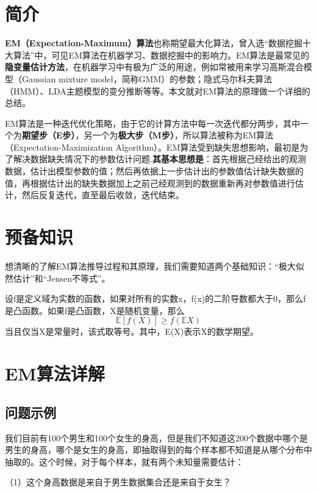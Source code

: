 \documentclass[11pt,a4paper,oneside]{book}
\begin{document}
\section{简介}
\textbf{EM（Expectation-Maximum）算法}也称期望最大化算法，曾入选“数据挖掘十大算法”中，可见EM算法在机器学习、数据挖掘中的影响力。EM算法是最常见的\textbf{隐变量估计方法}，在机器学习中有极为广泛的用途，例如常被用来学习高斯混合模型（Gaussian mixture model，简称GMM）的参数；隐式马尔科夫算法（HMM）、LDA主题模型的变分推断等等。本文就对EM算法的原理做一个详细的总结。

EM算法是一种迭代优化策略，由于它的计算方法中每一次迭代都分两步，其中一个为\textbf{期望步（E步）}，另一个为\textbf{极大步（M步）}，所以算法被称为EM算法（Expectation-Maximization Algorithm）。EM算法受到缺失思想影响，最初是为了解决数据缺失情况下的参数估计问题.\textbf{其基本思想是}：首先根据己经给出的观测数据，估计出模型参数的值；然后再依据上一步估计出的参数值估计缺失数据的值，再根据估计出的缺失数据加上之前己经观测到的数据重新再对参数值进行估计，然后反复迭代，直至最后收敛，迭代结束。
\section{预备知识}
想清晰的了解EM算法推导过程和其原理，我们需要知道两个基础知识：“极大似然估计”和“Jensen不等式”。

设f是定义域为实数的函数，如果对所有的实数x，f(x)的二阶导数都大于0，那么f是凸函数。如果f是凸函数，X是随机变量，那么
\begin{equation}
	\mathbb{E}[f(X)]\geq f(\mathbb{E}X)
\end{equation}
当且仅当X是常量时，该式取等号。其中，E(X)表示X的数学期望。

\section{EM算法详解}
\subsection{问题示例}
我们目前有100个男生和100个女生的身高，但是我们不知道这200个数据中哪个是男生的身高，哪个是女生的身高，即抽取得到的每个样本都不知道是从哪个分布中抽取的。这个时候，对于每个样本，就有两个未知量需要估计：

（1）这个身高数据是来自于男生数据集合还是来自于女生？
\end{document}

